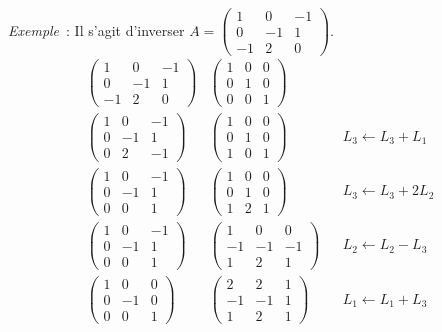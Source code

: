 \emph{Exemple}~: Il s'agit d'inverser \(A =\begin{pmatrix}  1 & 0 & -1 \\ 0 & -1 & 1\\ -1 & 2 & 0\end{pmatrix}\).
\begin{align}
  \begin{pmatrix}  1 & 0 & -1 \\ 0 & -1 & 1\\ -1 & 2 & 0\end{pmatrix} & \begin{pmatrix}  1 & 0 & 0 \\ 0 & 1 & 0\\ 0 & 0 & 1\end{pmatrix} \\
  \begin{pmatrix}  1 & 0 & -1 \\ 0 & -1 & 1\\ 0 & 2 & -1\end{pmatrix} & \begin{pmatrix}  1 & 0 & 0 \\ 0 & 1 & 0\\ 1 & 0 & 1\end{pmatrix} && L_3 \leftarrow L_3+L_1\\
  \begin{pmatrix}  1 & 0 & -1 \\ 0 & -1 & 1\\ 0 & 0 & 1\end{pmatrix} & \begin{pmatrix}  1 & 0 & 0 \\ 0 & 1 & 0\\ 1 & 2 & 1\end{pmatrix} && L_3 \leftarrow L_3+2L_2 \\
  \begin{pmatrix}  1 & 0 & -1 \\ 0 & -1 & 1\\ 0 & 0 & 1\end{pmatrix} & \begin{pmatrix}  1 & 0 & 0 \\ -1 & -1 & -1\\ 1 & 2 & 1\end{pmatrix} && L_2 \leftarrow L_2-L_3\\
  \begin{pmatrix}  1 & 0 & 0 \\ 0 & -1 & 0\\ 0 & 0 & 1\end{pmatrix} & \begin{pmatrix}2 & 2 & 1 \\ -1 & -1 & 1\\ 1 & 2 & 1 \end{pmatrix} && L_1 \leftarrow L_1+L_3\\

\end{align}
